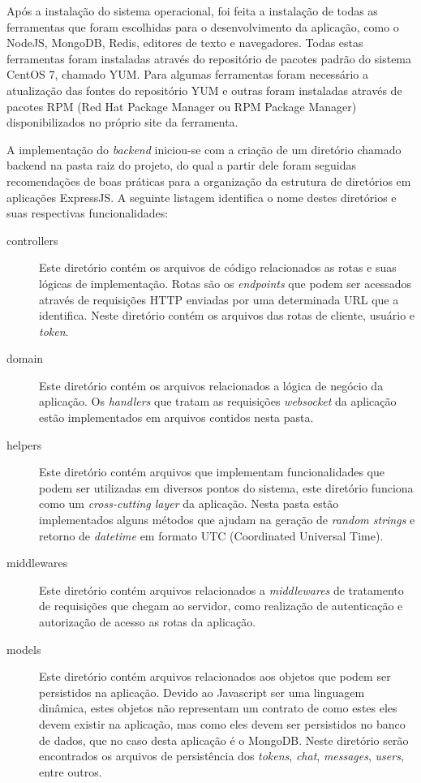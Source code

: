 Após a instalação do sistema operacional, foi feita a instalação de todas as ferramentas que foram escolhidas para o desenvolvimento da aplicação, como o NodeJS, MongoDB, Redis, editores de texto e navegadores. Todas estas ferramentas foram instaladas através do repositório de pacotes padrão do sistema CentOS 7, chamado YUM. Para algumas ferramentas foram necessário a atualização das fontes do repositório YUM e outras foram instaladas através de pacotes RPM (Red Hat Package Manager ou RPM Package Manager) disponibilizados no próprio site da ferramenta.

A implementação do \textit{backend} iniciou-se com a criação de um diretório chamado backend na pasta raiz do projeto, do qual a partir dele foram seguidas recomendações de boas práticas \cite{express-app-structure} para a organização da estrutura de diretórios em aplicações ExpressJS. A seguinte listagem identifica o nome destes diretórios e suas respectivas funcionalidades:

\begin{description}
	\item[controllers] Este diretório contém os arquivos de código relacionados as rotas e suas lógicas de implementação. Rotas são os \textit{endpoints} que podem ser acessados através de requisições HTTP enviadas por uma determinada URL que a identifica. Neste diretório contém os arquivos das rotas de cliente, usuário e \textit{token}.
	
	\item[domain] Este diretório contém os arquivos relacionados a lógica de negócio da aplicação. Os \textit{handlers} que tratam as requisições \textit{websocket} da aplicação estão implementados em arquivos contidos nesta pasta.
	
	\item[helpers] Este diretório contém arquivos que implementam funcionalidades que podem ser utilizadas em diversos pontos do sistema, este diretório funciona como um \textit{cross-cutting layer} da aplicação. Nesta pasta estão implementados alguns métodos que ajudam na geração de \textit{random strings} e retorno de \textit{datetime} em formato UTC (Coordinated Universal Time).
	
	\item[middlewares] Este diretório contém arquivos relacionados a \textit{middlewares} de tratamento de requisições que chegam ao servidor, como realização de autenticação e autorização de acesso as rotas da aplicação.
	
	\item[models] Este diretório contém arquivos relacionados aos objetos que podem ser persistidos na aplicação. Devido ao Javascript ser uma linguagem dinâmica, estes objetos não representam um contrato de como estes eles devem existir na aplicação, mas como eles devem ser persistidos no banco de dados, que no caso desta aplicação é o MongoDB. Neste diretório serão encontrados os arquivos de persistência dos \textit{tokens}, \textit{chat}, \textit{messages}, \textit{users}, entre outros.
\end{description}

